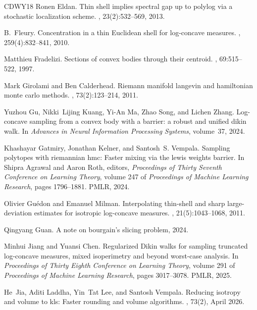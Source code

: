 \documentclass[11pt]{article}
\numberwithin{equation}{section}
\theoremstyle{definition}
\begin{document}
\begin{thebibliography}{CDWY18}
Ronen Eldan.
\newblock Thin shell implies spectral gap up to polylog via a stochastic
  localization scheme.
, 23(2):532--569, 2013.

B.~Fleury.
\newblock Concentration in a thin {E}uclidean shell for log-concave measures.
, 259(4):832--841, 2010.

Matthieu Fradelizi.
\newblock Sections of convex bodies through their centroid.
, 69:515--522, 1997.

Mark Girolami and Ben Calderhead.
\newblock Riemann manifold langevin and hamiltonian monte carlo methods.
, 73(2):123--214, 2011.

Yuzhou Gu, Nikki~Lijing Kuang, Yi-An Ma, Zhao Song, and Lichen Zhang.
\newblock Log-concave sampling from a convex body with a barrier: a robust and
  unified dikin walk.
\newblock In {\em Advances in Neural Information Processing Systems},
  volume~37, 2024.

Khashayar Gatmiry, Jonathan Kelner, and Santosh~S. Vempala.
\newblock Sampling polytopes with riemannian hmc: Faster mixing via the lewis
  weights barrier.
\newblock In Shipra Agrawal and Aaron Roth, editors, {\em Proceedings of Thirty
  Seventh Conference on Learning Theory}, volume 247 of {\em Proceedings of
  Machine Learning Research}, pages 1796--1881. PMLR, 2024.

Olivier Gu{\'e}don and Emanuel Milman.
\newblock Interpolating thin-shell and sharp large-deviation estimates for
  isotropic log-concave measures.
, 21(5):1043--1068, 2011.

Qingyang Guan.
\newblock A note on bourgain's slicing problem, 2024.

Minhui Jiang and Yuansi Chen.
\newblock Regularized {Dikin} walks for sampling truncated log-concave
  measures, mixed isoperimetry and beyond worst-case analysis.
\newblock In {\em Proceedings of Thirty Eighth Conference on Learning Theory},
  volume 291 of {\em Proceedings of Machine Learning Research}, pages
  3017--3078. PMLR, 2025.

He~Jia, Aditi Laddha, Yin~Tat Lee, and Santosh Vempala.
\newblock Reducing isotropy and volume to kls: Faster rounding and volume
  algorithms.
, 73(2), April 2026.


\end{thebibliography}
\end{document}
